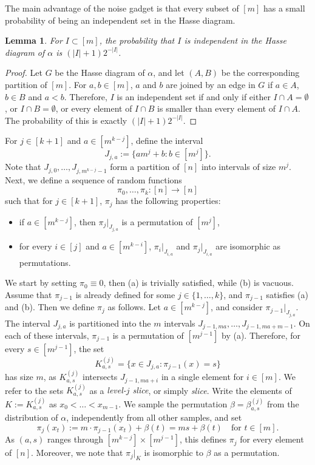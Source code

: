 \documentclass[11pt]{article}
\newtheorem{lemma}[theorem]{Lemma}
\theoremstyle{definition}
\begin{document}
 The main advantage of the noise gadget is that every subset of $[m]$ has a small probability of being an independent set in the Hasse diagram.

\begin{lemma}\label{lemma:gadget}
For $I\subset [m]$, the probability that $I$ is independent in the Hasse diagram of $\alpha$ is  $(|I|+1)2^{-|I|}$.
\end{lemma}

\begin{proof}
Let $G$ be the Hasse diagram of $\alpha$, and let $(A,B)$ be the corresponding partition of $[m]$. For $a,b\in [m]$, $a$ and $b$ are joined by an edge in $G$ if $a\in A$, $b\in B$ and $a<b$. Therefore, $I$ is an independent set if and only if either $I\cap A=\emptyset$, or $I\cap B=\emptyset$, or every element of $I\cap B$ is smaller than every element of $I\cap A$. The probability of this is exactly $(|I|+1)2^{-|I|}$.
\end{proof}

 For $j\in [k+1]$ and $a\in [m^{k-j}]$, define the interval
$$J_{j,a}:=\{am^j+b:b\in [m^j]\}.$$ 
Note that $J_{j,0},\dots,J_{j,m^{k-j}-1}$ form a partition of $[n]$ into intervals of size $m^j$. Next, we define a sequence of random functions $$\pi_0,\dots,\pi_k:[n]\rightarrow [n]$$ such that for $j\in [k+1]$, $\pi_j$ has the following properties:
\begin{itemize}
    \item[(a)] if $a\in [m^{k-j}]$, then $\pi_j|_{J_{j,a}}$ is a permutation of $[m^j]$,
    \vspace{-5pt}\item[(b)] for every $i\in [j]$ and $a\in [m^{k-i}]$, $\pi_{i}|_{J_{i,a}}$ and $\pi_j|_{J_{i,a}}$ are isomorphic as permutations.
\end{itemize}
We start by setting $\pi_0\equiv 0$, then (a) is trivially satisfied, while (b) is vacuous. Assume that $\pi_{j-1}$ is already defined for some $j\in \{1,\dots,k\}$, and $\pi_{j-1}$ satisfies (a) and  (b). Then we define $\pi_j$ as follows. Let $a\in [m^{k-j}]$, and consider $\pi_{j-1}|_{J_{j,a}}$. The interval $J_{j,a}$ is partitioned into the $m$ intervals $J_{j-1,ma},\dots,J_{j-1,ma+m-1}$. On each of these intervals, $\pi_{j-1}$ is a permutation of $[m^{j-1}]$ by (a). Therefore, for every $s\in [m^{j-1}]$, the set 
$$K^{(j)}_{a,s}=\{x\in J_{j,a}: \pi_{j-1}(x)=s\}$$ 
has size $m$, as $K_{a,s}^{(j)}$ intersects $J_{j-1,ma+i}$ in a single element for $i\in [m]$. We refer to the sets $K_{a,s}^{(j)}$ as a \emph{level-$j$ slice}, or simply \emph{slice}. Write the elements of $K:=K_{a,s}^{(j)}$ as $x_0<\dots<x_{m-1}$. We sample the permutation $\beta=\beta^{(j)}_{a,s}$ from the distribution of $\alpha$, independently from all other samples, and set  $$\pi_j(x_t):=m\cdot \pi_{j-1}(x_t)+\beta(t)=ms+\beta(t)\quad\text{for }t\in [m].$$
As $(a,s)$ ranges through $[m^{k-j}]\times [m^{j-1}]$, this defines $\pi_j$ for every element of $[n]$. Moreover, we note that $\pi_j|_K$ is isomorphic to $\beta$ as a permutation.
\end{document}
